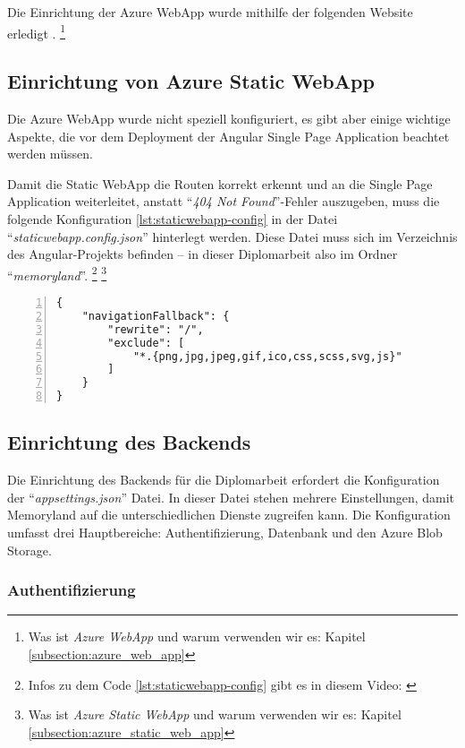 Die Einrichtung der Azure WebApp wurde mithilfe der folgenden Website erledigt 
\cite{MicrosoftCorporationi}.
\footnote{Was ist \emph{Azure WebApp} und warum verwenden wir es: Kapitel \ref{subsection:azure_web_app}}


\subsection{Einrichtung von Azure Static WebApp}

Die Azure WebApp wurde nicht speziell konfiguriert, es gibt aber einige wichtige Aspekte, 
die vor dem Deployment der Angular Single Page Application beachtet werden müssen.  

Damit die Static WebApp die Routen korrekt erkennt und an die Single Page Application 
weiterleitet, anstatt ``\emph{404 Not Found}''-Fehler auszugeben, muss die folgende 
Konfiguration \ref{lst:staticwebapp-config} in der Datei ``\emph{staticwebapp.config.json}'' hinterlegt werden. 
Diese Datei muss sich im Verzeichnis des Angular-Projekts befinden -- in dieser Diplomarbeit
also im Ordner ``\emph{memoryland}''. \footnote{Infos zu dem Code \ref{lst:staticwebapp-config} gibt es in diesem Video: \cite{MicrosoftCorporationj}}
\footnote{Was ist \emph{Azure Static WebApp} und warum verwenden wir es: Kapitel \ref{subsection:azure_static_web_app}}

\begin{lstlisting}[numbers=left,caption={staticwebapp.config.json},label={lst:staticwebapp-config}]
{
    "navigationFallback": {
        "rewrite": "/",
        "exclude": [
            "*.{png,jpg,jpeg,gif,ico,css,scss,svg,js}"
        ]
    }
}
\end{lstlisting}


\subsection{Einrichtung des Backends}

Die Einrichtung des Backends für die Diplomarbeit erfordert die Konfiguration 
der ``\emph{appsettings.json}'' Datei. In dieser Datei stehen mehrere Einstellungen,
damit Memoryland auf die unterschiedlichen Dienste zugreifen kann. Die Konfiguration 
umfasst drei Hauptbereiche: Authentifizierung, Datenbank und den Azure Blob Storage.

\subsubsection{Authentifizierung}

